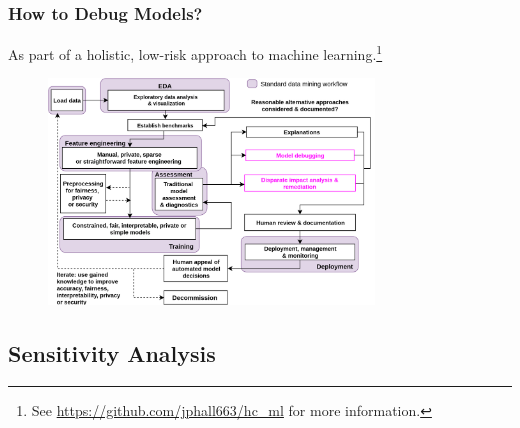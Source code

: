 \documentclass[11pt,
               aspectratio=43,
               hyperref={colorlinks}
               ]{beamer}
\begin{document}
			\begin{frame}
		
				\frametitle{How to Debug Models?}
		
				\footnotesize{As part of a holistic, low-risk approach to machine learning}.\footnote{\tiny{See \url{https://github.com/jphall663/hc_ml} for more information.}}
				\begin{figure}
					\begin{center}
						\includegraphics[height=170pt]{img/blueprint.png}
					\end{center}
				\end{figure}	
				\normalsize
		
			\end{frame}

		\subsection{Sensitivity Analysis}
\end{document}
